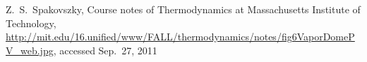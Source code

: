 Z.\ S.\ Spakovszky, Course notes of Thermodynamics at Massachusetts Institute of Technology, \url{http://mit.edu/16.unified/www/FALL/thermodynamics/notes/fig6VaporDomePV_web.jpg}, accessed Sep.\ 27, 2011%
